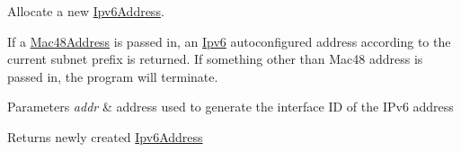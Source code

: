 Allocate a new \hyperlink{classns3_1_1Ipv6Address}{Ipv6\+Address}. 

If a \hyperlink{classns3_1_1Mac48Address}{Mac48\+Address} is passed in, an \hyperlink{classns3_1_1Ipv6}{Ipv6} autoconfigured address according to the current subnet prefix is returned. If something other than Mac48 address is passed in, the program will terminate.


\begin{DoxyParams}{Parameters}
{\em addr} & address used to generate the interface ID of the I\+Pv6 address \\
\hline
\end{DoxyParams}
\begin{DoxyReturn}{Returns}
newly created \hyperlink{classns3_1_1Ipv6Address}{Ipv6\+Address} 
\end{DoxyReturn}

